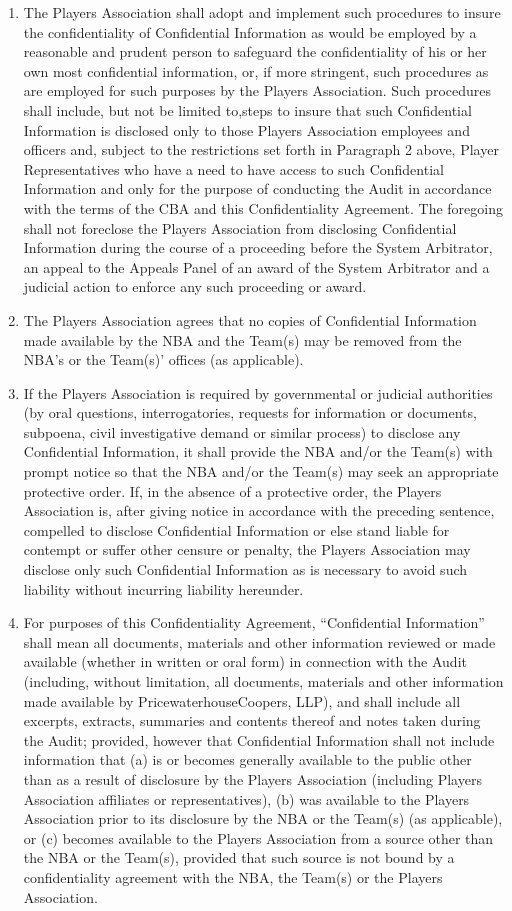 \documentclass[
]{book}
\begin{document}
\begin{enumerate}
\item
  The Players Association shall adopt and implement such procedures to insure the confidentiality of Confidential Information as would be employed by a reasonable and prudent person to safeguard the confidentiality of his or her own most confidential information, or, if more stringent, such procedures as are employed for such purposes by the Players Association. Such procedures shall include, but not be limited to,steps to insure that such Confidential Information is disclosed only to those Players Association employees and officers and, subject to the restrictions set forth in Paragraph 2 above, Player Representatives who have a need to have access to such Confidential Information and only for the purpose of conducting the Audit in accordance with the terms of the CBA and this Confidentiality Agreement. The foregoing shall not foreclose the Players Association from disclosing Confidential Information during the course of a proceeding before the System Arbitrator, an appeal to the Appeals Panel of an award of the System Arbitrator and a judicial action to enforce any such proceeding or award.
\item
  The Players Association agrees that no copies of Confidential Information made available by the NBA and the Team(s) may be removed from the NBA's or the Team(s)' offices (as applicable).
\item
  If the Players Association is required by governmental or judicial authorities (by oral questions, interrogatories, requests for information or documents, subpoena, civil investigative demand or similar process) to disclose any Confidential Information, it shall provide the NBA and/or the Team(s) with prompt notice so that the NBA and/or the Team(s) may seek an appropriate protective order. If, in the absence of a protective order, the Players Association is, after giving notice in accordance with the preceding sentence, compelled to disclose Confidential Information or else stand liable for contempt or suffer other censure or penalty, the Players Association may disclose only such Confidential Information as is necessary to avoid such liability without incurring liability hereunder.
\item
  For purposes of this Confidentiality Agreement, ``Confidential Information'' shall mean all documents, materials and other information reviewed or made available (whether in written or oral form) in connection with the Audit (including, without limitation, all documents, materials and other information made available by PricewaterhouseCoopers, LLP), and shall include all excerpts, extracts, summaries and contents thereof and notes taken during the Audit; provided, however that Confidential Information shall not include information that (a) is or becomes generally available to the public other than as a result of disclosure by the Players Association (including Players Association affiliates or representatives), (b) was available to the Players Association prior to its disclosure by the NBA or the Team(s) (as applicable), or (c) becomes available to the Players Association from a source other than the NBA or the Team(s), provided that such source is not bound by a confidentiality agreement with the NBA, the Team(s) or the Players Association.

\end{enumerate}
\end{document}
